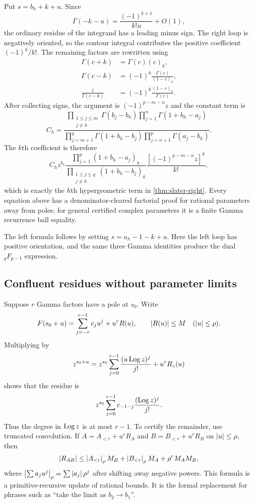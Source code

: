 Put $s=b_h+k+u$.  Since
\[
 \Gamma(-k-u)=\frac{(-1)^{k+1}}{k!u}+O(1),
\]
the ordinary residue of the integrand has a leading minus sign.  The right
loop is negatively oriented, so the contour integral contributes the positive
coefficient $(-1)^k/k!$.  The remaining factors are rewritten using
\begin{align*}
 \Gamma(c+k)&=\Gamma(c)(c)_k,\\
 \Gamma(c-k)&=(-1)^k\frac{\Gamma(c)}{(1-c)_k},\\
 \frac1{\Gamma(c-k)}&=(-1)^k\frac{(1-c)_k}{\Gamma(c)}.
\end{align*}
After collecting signs, the argument is
$(-1)^{p-m-n}z$ and the constant term is
\begin{equation}\label{eq:appendix-Ch}
 C_h=
 \frac{\displaystyle
   \prod_{\substack{1\le j\le m\\j\ne h}}\Gamma(b_j-b_h)
   \prod_{j=1}^{n}\Gamma(1+b_h-a_j)}
 {\displaystyle
   \prod_{j=m+1}^{q}\Gamma(1+b_h-b_j)
   \prod_{j=n+1}^{p}\Gamma(a_j-b_h)}.
\end{equation}
The $k$th coefficient is therefore
\[
 C_hz^{b_h}
 \frac{\prod_{j=1}^{p}(1+b_h-a_j)_k}
      {\prod_{\substack{1\le j\le q\\j\ne h}}
       (1+b_h-b_j)_k}
 \frac{[(-1)^{p-m-n}z]^k}{k!},
\]
which is exactly the $h$th hypergeometric term in
\cref{thm:slater-right}.  Every equation above has a denominator-cleared
factorial proof for rational parameters away from poles; for general certified
complex parameters it is a finite Gamma recurrence ball equality.

The left formula follows by setting $s=a_h-1-k+u$.  Here the left loop has
positive orientation, and the same three Gamma identities produce the dual
${}_qF_{p-1}$ expression.

\subsection{Confluent residues without parameter limits}

Suppose $r$ Gamma factors have a pole at $s_0$.  Write
\[
 F(s_0+u)=\sum_{j=-r}^{r-1}c_ju^j+u^rR(u),
 \qquad \left|R(u)\right|\le M
 \quad(\left|u\right|\le\rho).
\]
Multiplying by
\[
 z^{s_0+u}=z^{s_0}\sum_{j=0}^{r-1}
 \frac{(u\operatorname{Log} z)^j}{j!}+u^rR_z(u)
\]
shows that the residue is
\begin{equation}\label{eq:appendix-confluent-res}
 z^{s_0}\sum_{j=0}^{r-1}c_{-1-j}\frac{(\operatorname{Log} z)^j}{j!}.
\end{equation}
Thus the degree in $\operatorname{Log} z$ is at most $r-1$.  To certify the remainder, use
truncated convolution.  If
$A=A_{<r}+u^rR_A$ and $B=B_{<r}+u^rR_B$ on $\left|u\right|\le\rho$, then
\[
 \left|R_{AB}\right|
 \le \left|A_{<r}\right|_\rho M_B+
      \left|B_{<r}\right|_\rho M_A+\rho^rM_AM_B,
\]
where $\left|\sum a_ju^j\right|_\rho=\sum\left|a_j\right|\rho^j$ after shifting away
negative powers.  This formula is a primitive-recursive update of rational
bounds.  It is the formal replacement for phrases such as ``take the limit as
$b_2\to b_1$''.

